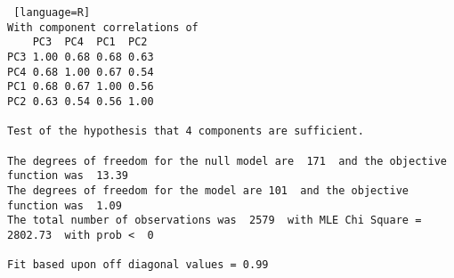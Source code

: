 \begin{lstlisting} [language=R]
With component correlations of 
    PC3  PC4  PC1  PC2
PC3 1.00 0.68 0.68 0.63
PC4 0.68 1.00 0.67 0.54
PC1 0.68 0.67 1.00 0.56
PC2 0.63 0.54 0.56 1.00

Test of the hypothesis that 4 components are sufficient.

The degrees of freedom for the null model are  171  and the objective function was  13.39
The degrees of freedom for the model are 101  and the objective function was  1.09 
The total number of observations was  2579  with MLE Chi Square =  2802.73  with prob <  0 

Fit based upon off diagonal values = 0.99


\end{lstlisting}